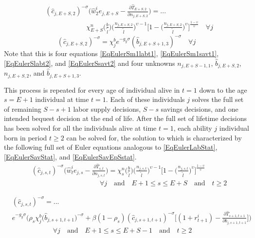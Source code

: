 \documentclass[letterpaper,12pt]{article}
\theoremstyle{definition}
\begin{document}
  \begin{equation}\label{EqEulerSlabt2}
    \begin{split}
      &(\hat{c}_{j,E+S,2})^{-\sigma}\Biggl(\hat{w}_2^i e_{j,E+S} - \frac{\partial\hat{T}_{E+S,2}}{\partial n_{j,E+S,2}}\Biggr) = ... \\
      &\qquad\qquad\qquad \chi^n_{E+S}\biggl(\frac{b}{\tilde{l}}\biggr)\biggl(\frac{n_{j,E+S,2}}{\tilde{l}}\biggr)^{\upsilon-1}\Biggl[1 - \biggl(\frac{n_{j,E+S,2}}{\tilde{l}}\biggr)^\upsilon\Biggr]^{\frac{1-\upsilon}{\upsilon}} \quad\forall j
    \end{split}
  \end{equation}
  \begin{equation}\label{EqEulerSsavt2}
    (\hat{c}_{j,E+S,2})^{-\sigma} = \chi^b_j e^{-g_y\sigma}(\hat{b}_{j,E+S+1,3})^{-\sigma} \quad\forall j
  \end{equation}
  Note that this is four equations \eqref{EqEulerSm1labt1}, \eqref{EqEulerSm1savt1}, \eqref{EqEulerSlabt2}, and \eqref{EqEulerSsavt2} and four unknowns $n_{j,E+S-1,1}$, $\hat{b}_{j,E+S,2}$, $n_{j,E+S,2}$, and $\hat{b}_{j,E+S+1,3}$.

  This process is repeated for every age of individual alive in $t=1$ down to the age $s=E+1$ individual at time $t=1$. Each of these individuals $j$ solves the full set of remaining $S-s+1$ labor supply decisions, $S-s$ savings decisions, and one intended bequest decision at the end of life. After the full set of lifetime decisions has been solved for all the individuals alive at time $t=1$, each ability $j$ individual born in period $t\geq 2$ can be solved for, the solution to which is characterized by the following full set of Euler equations analogous to \eqref{EqEulerLabStat}, \eqref{EqEulerSavStat}, and \eqref{EqEulerSavEpSstat}.
  \begin{equation}\label{EqEulerslabt}
    \begin{split}
      &(\hat{c}_{j,s,t})^{-\sigma}\Biggl(\hat{w}_t^i e_{j,s} - \frac{\partial\hat{T}_{s,t}}{\partial n_{j,s,t}}\Biggr) =  \chi^n_{s}\biggl(\frac{b}{\tilde{l}}\biggr)\biggl(\frac{n_{j,s,t}}{\tilde{l}}\biggr)^{\upsilon-1}\Biggl[1 - \biggl(\frac{n_{j,s,t}}{\tilde{l}}\biggr)^\upsilon\Biggr]^{\frac{1-\upsilon}{\upsilon}} \\
      &\qquad\qquad\qquad\qquad\qquad\forall j \quad\text{and}\quad E+1\leq s\leq E+S\quad\text{and}\quad t\geq 2
    \end{split}
  \end{equation}

  \begin{equation}\label{EqEulersSavt}
    \begin{split}
      &(\hat{c}_{j,s,t})^{-\sigma} = ... \\
      &e^{-g_y\sigma}\Biggl(\rho_{s}\chi^b_j \bigl(\hat{b}_{j,s+1,t+1}\bigr)^{-\sigma} + \beta(1-\rho_{s})(\hat{c}_{j,s+1,t+1})^{-\sigma}\Biggl[(1 + r_{t+1}^i) - \frac{\partial\hat{T}_{s+1,t+1}}{\partial b_{j,s+1,t+1}}\Biggr]\Biggr) \\
      &\qquad\qquad\qquad\forall j \quad\text{and}\quad E+1\leq s\leq E+S-1 \quad\text{and}\quad t\geq 2
    \end{split}
  \end{equation}
\end{document}
